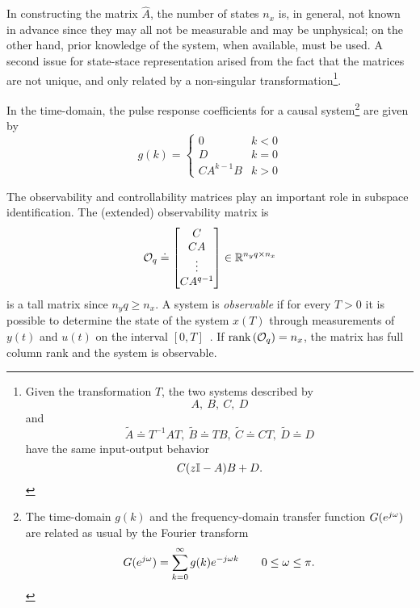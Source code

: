 In constructing the matrix $\hat{A}$, the number of states $n_x$ is, in general, not known in advance since they may all not be measurable and may be unphysical; on the other hand, prior knowledge of the system, when available, must be used. A second issue for state-stace representation arised from the fact that the matrices are not unique, and only related by a non-singular transformation\footnote{Given the transformation $T$, the two systems described by
  \begin{equation*}
    A,\ B,\ C,\ D
  \end{equation*}
  and
  \begin{equation*}
    \tilde{A}\doteq T^{-1}AT,\ \tilde{B}\doteq TB,\ \tilde{C}\doteq CT,\ \tilde{D}\doteq D
  \end{equation*}
  have the same input-output behavior
  \begin{equation*}
    C(z\mathbb{I} - A)B + D.
  \end{equation*}}.

In the time-domain, the pulse response coefficients for a causal system\footnote{The time-domain $g(k)$ and the frequency-domain transfer function $G(e^{j\omega})$ are related as usual by the Fourier transform
  \begin{equation*}
    G(e^{j\omega}) = \sum_{k=0}^\infty g(k)e^{-j\omega k}\hspace{2em} 0 \leq \omega \leq \pi.
  \end{equation*}
} are given by
\begin{equation}
  \label{eq:pulse-response-coefficients}
  g(k) =
  \begin{cases}
    0 & k < 0 \\
    D & k = 0 \\
    CA^{k-1}B & k > 0
  \end{cases}
\end{equation}

The observability and controllability matrices play an important role in subspace identification. The (extended) observability matrix is
\begin{equation*}
  \mathcal{O}_q \doteq
  \begin{bmatrix}
    C \\ CA \\ \vdots \\ CA^{q-1}
  \end{bmatrix} \in \mathbb{R}^{n_yq \times n_x}
\end{equation*}
is a tall matrix since $n_yq \geq n_x$. A system is \emph{observable} if for every $T>0$ it is possible to determine the state of the system $x(T)$ through measurements of $y(t)$ and $u(t)$ on the interval $[0, T]$~\cite[Sect.~8]{fbs}. If $\textrm{rank}\left(\mathcal{O}_q\right)=n_x$, the matrix has full column rank and the system is observable.

